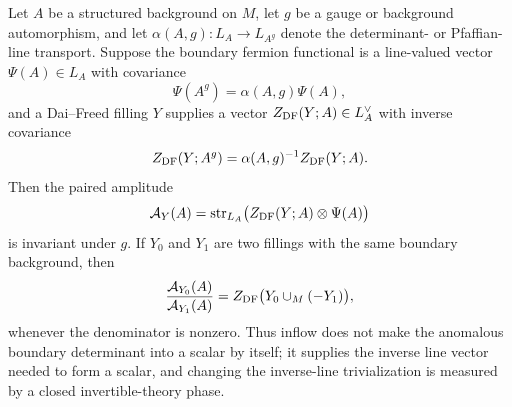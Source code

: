 \begin{proposition}
\label{prop:dai-freed-boundary-pairing-cancels-cocycle}
Let \(A\) be a structured background on \(M\), let \(g\) be a gauge or
background automorphism, and let
\(\alpha(A,g):L_A\to L_{A^g}\) denote the determinant- or Pfaffian-line
transport.  Suppose the boundary fermion functional is a line-valued vector
\(\Psi(A)\in L_A\) with covariance
\begin{equation}
  \Psi(A^g)=\alpha(A,g)\Psi(A),
  \label{eq:boundary-fermion-line-covariance}
\end{equation}
and a Dai--Freed filling \(Y\) supplies a vector
\(Z_{\rm DF}(Y;A)\in L_A^\vee\) with inverse covariance
\begin{equation}
  Z_{\rm DF}(Y;A^g)
  =
  \alpha(A,g)^{-1}Z_{\rm DF}(Y;A).
  \label{eq:dai-freed-inverse-line-covariance}
\end{equation}
Then the paired amplitude
\begin{equation}
  \mathcal A_Y(A)
  =
  \operatorname{str}_{L_A}
  \bigl(Z_{\rm DF}(Y;A)\otimes\Psi(A)\bigr)
  \label{eq:dai-freed-paired-boundary-amplitude}
\end{equation}
is invariant under \(g\).  If \(Y_0\) and \(Y_1\) are two fillings with the
same boundary background, then
\begin{equation}
  \frac{\mathcal A_{Y_0}(A)}{\mathcal A_{Y_1}(A)}
  =
  Z_{\rm DF}\bigl(Y_0\cup_M(-Y_1)\bigr),
  \label{eq:dai-freed-filling-change-closed-phase}
\end{equation}
whenever the denominator is nonzero.  Thus inflow does not make the anomalous
boundary determinant into a scalar by itself; it supplies the inverse line
vector needed to form a scalar, and changing the inverse-line trivialization
is measured by a closed invertible-theory phase.
\end{proposition}

